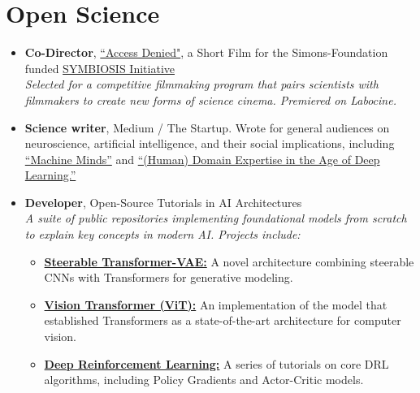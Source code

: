 \documentclass[10pt]{article}
\begin{document}
\section{Open Science}
\begin{itemize}
    \item \textbf{Co-Director}, \href{https://vimeo.com/762955684/c5b6166d3d}{``Access Denied"}, a Short Film for the Simons-Foundation funded \href{https://www.labocine.com/spotlights/symbiosis-and-the-science-new-wave}{SYMBIOSIS Initiative} \\
    \textit{Selected for a competitive filmmaking program that pairs scientists with filmmakers to create new forms of science cinema. Premiered on Labocine.}

    \item \textbf{Science writer}, Medium / The Startup. Wrote for general audiences on neuroscience, artificial intelligence, and their social implications, including \href{https://medium.com/swlh/machine-minds-a59cfb8d8d14}{``Machine Minds''} and \href{https://medium.com/swlh/human-domain-expertise-in-the-age-of-deep-learning-89b3381c5cba}{``(Human) Domain Expertise in the Age of Deep Learning.''}

    \item \textbf{Developer}, Open-Source Tutorials in AI Architectures \\
    \textit{A suite of public repositories implementing foundational models from scratch to explain key concepts in modern AI. Projects include:}
    \begin{itemize}
        \item \href{https://github.com/jordanlei/steerable-transformer-vae}{\textbf{Steerable Transformer-VAE:}} A novel architecture combining steerable CNNs with Transformers for generative modeling.
        \item \href{https://github.com/jordanlei/vision-transformer}{\textbf{Vision Transformer (ViT):}} An implementation of the model that established Transformers as a state-of-the-art architecture for computer vision.
        \item \href{https://github.com/jordanlei/deep-reinforcement-learning-cartpole}{\textbf{Deep Reinforcement Learning:}} A series of tutorials on core DRL algorithms, including Policy Gradients and Actor-Critic models.
    \end{itemize}
\end{itemize}
\end{document}
